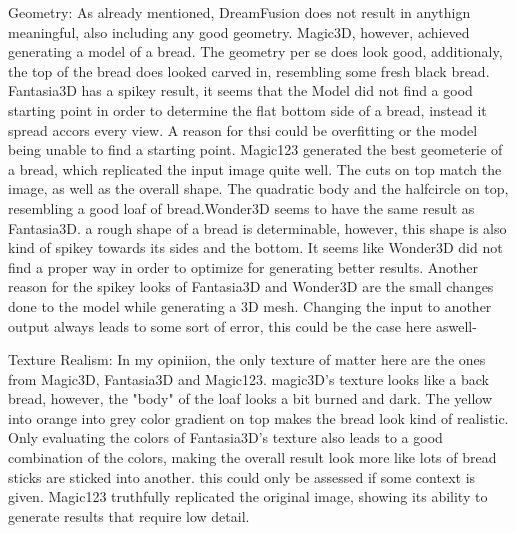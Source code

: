 Geometry: As already mentioned, DreamFusion does not result in anythign meaningful, also including any good geometry. Magic3D, however, achieved generating a model of a bread. The geometry per se does look good, additionaly, the top of the bread does looked carved in, resembling some fresh black bread. Fantasia3D has a spikey result, it seems that the Model did not find a good starting point in order to determine the flat bottom side of a bread, instead it spread accors every view. A reason for thsi could be overfitting or the model being unable to find a starting point. Magic123 generated the best geometerie of a bread, which replicated the input image quite well. The cuts on top match the image, as well as the overall shape. The quadratic body and the halfcircle on top, resembling a good loaf of bread.Wonder3D seems to have the same result as Fantasia3D. a rough shape of a bread is determinable, however, this shape is also kind of spikey towards its sides and the bottom. It seems like Wonder3D did not find a proper way in order to optimize for generating better results. Another reason for the spikey looks of Fantasia3D and Wonder3D are the small changes done to the model while generating a 3D mesh. Changing the input to another output always leads to some sort of error, this could be the case here aswell-

Texture Realism: In my opiniion, the only texture of matter here are the ones from Magic3D, Fantasia3D and Magic123. magic3D's texture looks like a back bread, however, the "body" of the loaf looks a bit burned and dark. The yellow into orange into grey color gradient on top makes the bread look kind of realistic. Only evaluating the colors of Fantasia3D's texture also leads to a good combination of the colors, making the overall result look more like lots of bread sticks are sticked into another. this could only be assessed if some context is given. Magic123 truthfully replicated the original image, showing its ability to generate results that require low detail.


